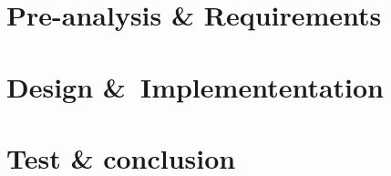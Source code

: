 %

\part{Pre-analysis \& Requirements}\label{pt:preanalysis_req}
%

%

\graphicspath{{figures/technical/}}

















\part{Design \&\ Implemententation}\label{pt:design} 

%


\part{Test \& conclusion}\label{pt:test_conclusion}



